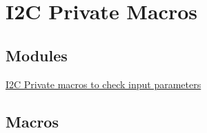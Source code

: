\hypertarget{group___i2_c___private___macros}{}\section{I2C Private Macros}
\label{group___i2_c___private___macros}
\subsection*{Modules}
\begin{DoxyCompactItemize}
\item 
\hyperlink{group___i2_c___i_s___r_t_c___definitions}{I2\+C Private macros to check input parameters}
\end{DoxyCompactItemize}
\subsection*{Macros}
